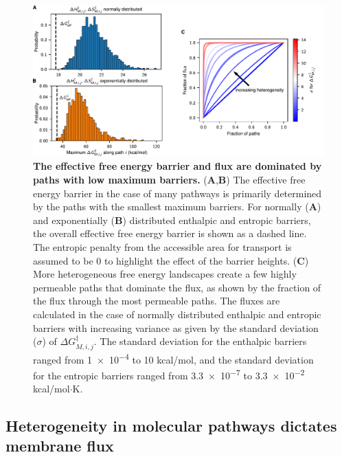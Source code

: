 \documentclass[12pt]{article}
\begin{document}
\begin{figure}[ht!]
    \centering
    \includegraphics[width=\textwidth]{figures/fig4.pdf}
    \caption{\textbf{The effective free energy barrier and flux are dominated by paths with low maximum barriers.} (\textbf{A},\textbf{B}) The effective free energy barrier in the case of many pathways is primarily determined by the paths with the smallest maximum barriers. For normally (\textbf{A}) and exponentially (\textbf{B}) distributed enthalpic and entropic barriers, the overall effective free energy barrier is shown as a dashed line. The entropic penalty from the accessible area for transport is assumed to be 0 to highlight the effect of the barrier heights. (\textbf{C}) More heterogeneous free energy landscapes create a few highly permeable paths that dominate the flux, as shown by the fraction of the flux through the most permeable paths. The fluxes are calculated in the case of normally distributed enthalpic and entropic barriers with increasing variance as given by the standard deviation ($\sigma$) of $\Delta G_{M,i,j}^{\ddagger}$. The standard deviation for the enthalpic barriers ranged from \num{1e-4} to 10 kcal/mol, and the standard deviation for the entropic barriers ranged from \num{3.3e-7} to \num{3.3e-2} kcal/mol$\cdot$K.}
    \label{fig:max_barriers_and_ROC}
\end{figure}

\subsection*{Heterogeneity in molecular pathways dictates membrane flux}
\end{document}
